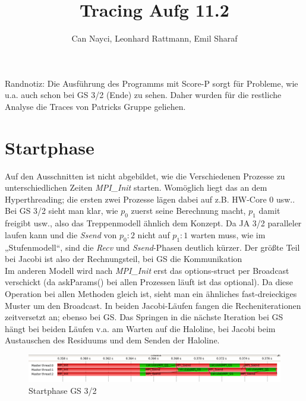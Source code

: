 \documentclass[a4paper,10pt]{article}
\title{Tracing Aufg 11.2}
\author{Can Nayci, Leonhard Rattmann, Emil Sharaf}
\begin{document}
\maketitle

Randnotiz: Die Ausführung des Programms mit Score-P sorgt für Probleme, wie u.a. auch schon bei GS 3/2 (Ende) zu sehen. Daher wurden für die restliche Analyse die Traces von Patricks Gruppe geliehen.

\section{Startphase}
Auf den Ausschnitten ist nicht abgebildet, wie die Verschiedenen Prozesse zu unterschiedlichen Zeiten \textit{MPI\_Init} starten. Womöglich liegt das an dem Hyperthreading; die ersten zwei Prozesse lägen dabei auf z.B. HW-Core 0 usw..\\

Bei GS 3/2 sieht man klar, wie $p_0$ zuerst seine Berechnung macht, $p_1$ damit freigibt usw., also das Treppenmodell ähnlich dem Konzept. Da JA 3/2 paralleler laufen kann und die \textit{Ssend} von $p_0:2$ nicht auf $p_1:1$ warten muss, wie im „Stufenmodell“, sind die \textit{Recv} und \textit{Ssend}-Phasen deutlich kürzer. Der größte Teil bei Jacobi ist also der Rechnungsteil, bei GS die Kommunikation \\

Im anderen Modell wird nach \textit{MPI\_Init} erst das options-struct per Broadcast verschickt (da askParams() bei allen Prozessen läuft ist das optional). Da diese Operation bei allen Methoden gleich ist, sieht man ein ähnliches fast-dreieckiges Muster um den Broadcast. In beiden Jacobi-Läufen fangen die Recheniterationen zeitversetzt an; ebenso bei GS. Das Springen in die nächste Iteration bei GS hängt bei beiden Läufen v.a. am Warten auf die Haloline, bei Jacobi beim Austauschen des Residuums und dem Senden der Haloline.\\
\begin{figure}[h!]
  \caption{Startphase GS 3/2}
  \includegraphics[width=14cm]{c_start_GS_3x2.png}
\end{figure}
\end{document}
